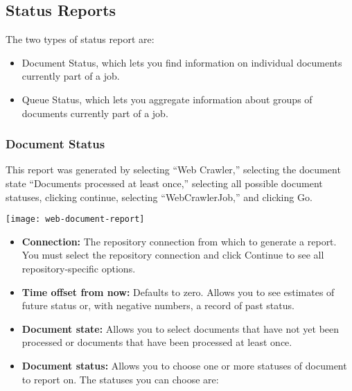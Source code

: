 \begin{changemargin}{1.5in}{0in}
\subsection{Status Reports}

The two types of status report are:

\begin{itemize}

\item Document Status, which lets you find information on individual
documents currently part of a job.

\item Queue Status, which lets you aggregate information about groups
of documents currently part of a job.

\end{itemize}

\subsubsection{Document Status}

This report was generated by selecting ``Web Crawler,'' selecting the document state ``Documents processed at
least once,'' selecting all possible document statuses, clicking
continue, selecting ``WebCrawlerJob,'' and clicking Go.

\texttt{[image: web-document-report]}

\begin{itemize}

\item \textbf{Connection:} The repository connection from which to 
generate a report. You must select the repository connection and click
Continue to see all repository-specific options. %

\item \textbf{Time offset from now:} Defaults to zero. Allows you to
see estimates of future status or, with negative numbers, a record of
past status.

\item \textbf{Document state:} Allows you to select documents that
have not yet been processed or documents that have been processed
at least once.

\item \textbf{Document status:} Allows you to choose one or more 
statuses of document to report on. The statuses you can choose are:

\begin{itemize}


\end{itemize}
\end{itemize}
\end{changemargin}
